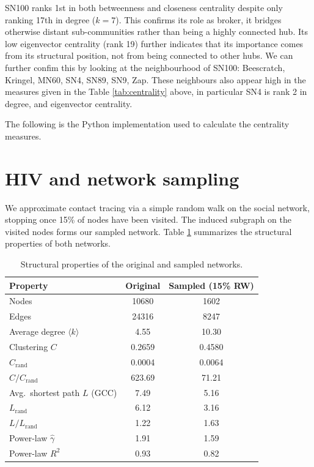 \documentclass[12pt]{article}
\theoremstyle{definition}
\begin{document}
SN100 ranks 1st in both betweenness and closeness centrality despite only ranking 17th in degree ($k=7$). This confirms its role as broker, it bridges otherwise distant sub-communities rather than being a highly connected hub. Its low eigenvector centrality (rank 19) further indicates that its importance comes from its structural position, not from being connected to other hubs.  We can further confim this by looking at the neighbourhood of SN100: Beescratch, Kringel, MN60, SN4, SN89, SN9, Zap. These neighbours also appear high in the measures given in the Table \ref{tab:centrality} above, in particular SN4 is rank 2 in degree, and eigenvector centrality.

The following is the Python implementation used to calculate the centrality measures.



\newpage

\section{HIV and network sampling}

We approximate contact tracing via a simple random walk on the social network, stopping once 15\% of nodes have been visited. The induced subgraph on the visited nodes forms our sampled network. Table \ref{tab:networks} summarizes the structural properties of both networks.

\begin{table}[h]
\centering
\caption{Structural properties of the original and sampled networks.}
\label{tab:networks}
\begin{tabular}{@{}lcc@{}}
\toprule
Property & Original & Sampled (15\% RW) \\
\midrule
Nodes & 10680 & 1602 \\
Edges & 24316 & 8247 \\
Average degree $\langle k \rangle$ & 4.55 & 10.30 \\
Clustering $C$ & 0.2659 & 0.4580 \\
$C_{\text{rand}}$ & 0.0004 & 0.0064 \\
$C / C_{\text{rand}}$ & 623.69 & 71.21 \\
Avg.\ shortest path $L$ (GCC) & 7.49 & 5.16 \\
$L_{\text{rand}}$ & 6.12 & 3.16 \\
$L / L_{\text{rand}}$ & 1.22 & 1.63 \\
Power-law $\hat{\gamma}$ & 1.91 & 1.59 \\
Power-law $R^2$ & 0.93 & 0.82 \\
\bottomrule
\end{tabular}
\end{table}
\end{document}
